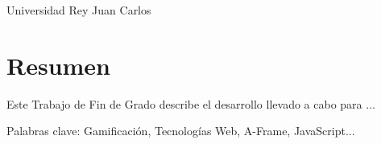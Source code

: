 \newpage
Universidad Rey Juan Carlos \setlength{\parskip}{0.5cm}

\thispagestyle{plain}			%
\setlength{\parskip}{0pt plus 1.0pt}
\section*{Resumen}
Este Trabajo de Fin de Grado describe el desarrollo llevado a cabo para ...


\vfill
Palabras clave: Gamificación, Tecnologías Web, A-Frame, JavaScript...
